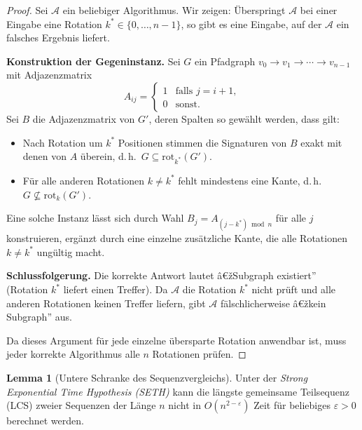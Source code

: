 ﻿\documentclass[a4paper,12pt]{article}
\theoremstyle{definition}
\newtheorem{lemma}{Lemma}
\begin{document}
\begin{proof}
Sei $\mathcal{A}$ ein beliebiger Algorithmus.
Wir zeigen: Überspringt $\mathcal{A}$ bei einer Eingabe eine Rotation $k^* \in \{0,\ldots,n-1\}$, so gibt es eine Eingabe, auf der $\mathcal{A}$ ein falsches Ergebnis liefert.

\textbf{Konstruktion der Gegeninstanz.}
Sei $G$ ein Pfadgraph $v_0 \to v_1 \to \cdots \to v_{n-1}$ mit Adjazenzmatrix
\[
	A_{ij} = \begin{cases} 1 & \text{falls } j = i+1, \\ 0 & \text{sonst.} \end{cases}
\]
Sei $B$ die Adjazenzmatrix von $G'$, deren Spalten so gewählt werden, dass gilt:
\begin{itemize}
	\item Nach Rotation um $k^*$ Positionen stimmen die Signaturen von $B$ exakt mit denen von $A$ überein, d.\,h.\ $G \subseteq \mathrm{rot}_{k^*}(G')$.
	\item Für alle anderen Rotationen $k \ne k^*$ fehlt mindestens eine Kante, d.\,h.\ $G \not\subseteq \mathrm{rot}_k(G')$.
\end{itemize}
Eine solche Instanz lässt sich durch Wahl $B_j = A_{(j - k^*) \bmod n}$ für alle $j$ konstruieren, ergänzt durch eine einzelne zusätzliche Kante, die alle Rotationen $k \ne k^*$ ungültig macht.

\textbf{Schlussfolgerung.}
Die korrekte Antwort lautet â€žSubgraph existiert'' (Rotation $k^*$ liefert einen Treffer).
Da $\mathcal{A}$ die Rotation $k^*$ nicht prüft und alle anderen Rotationen keinen Treffer liefern, gibt $\mathcal{A}$ fälschlicherweise â€žkein Subgraph'' aus.

Da dieses Argument für jede einzelne übersparte Rotation anwendbar ist, muss jeder korrekte Algorithmus alle $n$ Rotationen prüfen.
\end{proof}

\begin{lemma}[Untere Schranke des Sequenzvergleichs]
\label{lem:lcs}
Unter der \emph{Strong Exponential Time Hypothesis (SETH)} kann die längste gemeinsame Teil\-sequenz (LCS) zweier Sequenzen der Länge $n$ nicht in $O(n^{2-\varepsilon})$ Zeit für beliebiges $\varepsilon > 0$ berechnet werden.
\end{lemma}
\end{document}
